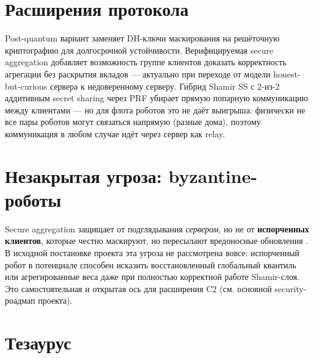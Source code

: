 \documentclass[11pt]{article}
\begin{document}
\section{Расширения протокола}

Post-quantum вариант \cite{pqsf2024} заменяет DH-ключи маскирования на решёточную
криптографию для долгосрочной устойчивости. Верифицируемая secure aggregation
\cite{groupverifiable2025} добавляет возможность группе клиентов доказать корректность
агрегации без раскрытия вкладов — актуально при переходе от модели
\guillemotleft honest-but-curious\guillemotright{} сервера к недоверенному серверу.
Гибрид Shamir SS с 2-из-2 аддитивным secret sharing через PRF убирает прямую
попарную коммуникацию между клиентами \cite{sokseragg} — но для флота роботов это не
даёт выигрыша: физически не все пары роботов могут связаться напрямую (разные дома),
поэтому коммуникация в любом случае идёт через сервер как relay.

\section{Незакрытая угроза: byzantine-роботы}

Secure aggregation защищает от подглядывания \emph{сервером}, но не от
\textbf{испорченных клиентов}, которые честно маскируют, но пересылают вредоносные
обновления \cite{sable2023}. В исходной постановке проекта эта угроза не рассмотрена
вовсе: испорченный робот в потенциале способен исказить восстановленный глобальный
квантиль или агрегированные веса даже при полностью корректной работе Shamir-слоя.
Это самостоятельная и открытая ось для расширения C2 (см. основной security-роадмап
проекта).

\section{Тезаурус}
\end{document}

